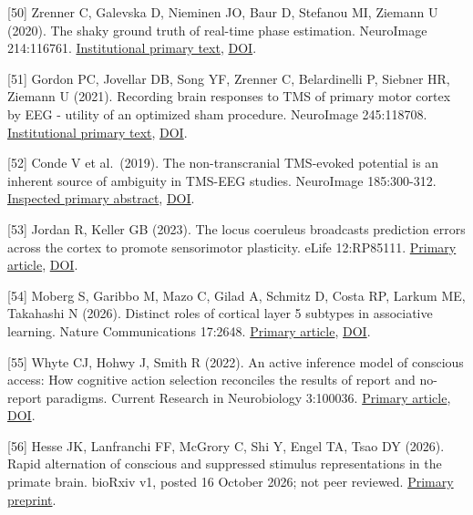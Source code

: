 \documentclass[
  american,
  11pt,
  letterpaper,
]{article}
\begin{document}
{[}50{]} Zrenner C, Galevska D, Nieminen JO, Baur D, Stefanou MI, Ziemann U (2020). The shaky ground truth of real-time phase estimation. NeuroImage 214:116761. \href{https://acris.aalto.fi/ws/portalfiles/portal/42216767/Zrenner_The_Shaky_Ground.1_s2.0_S1053811920302482_main.pdf}{Institutional primary text}, \href{https://doi.org/10.1016/j.neuroimage.2020.116761}{DOI}.

{[}51{]} Gordon PC, Jovellar DB, Song YF, Zrenner C, Belardinelli P, Siebner HR, Ziemann U (2021). Recording brain responses to TMS of primary motor cortex by EEG - utility of an optimized sham procedure. NeuroImage 245:118708. \href{https://iris.unitn.it/retrieve/handle/11572/325772/512900/Gordon_NI_2021.pdf}{Institutional primary text}, \href{https://doi.org/10.1016/j.neuroimage.2021.118708}{DOI}.

{[}52{]} Conde V et al.~(2019). The non-transcranial TMS-evoked potential is an inherent source of ambiguity in TMS-EEG studies. NeuroImage 185:300-312. \href{https://pubmed.ncbi.nlm.nih.gov/30347282/}{Inspected primary abstract}, \href{https://doi.org/10.1016/j.neuroimage.2018.10.052}{DOI}.

{[}53{]} Jordan R, Keller GB (2023). The locus coeruleus broadcasts prediction errors across the cortex to promote sensorimotor plasticity. eLife 12:RP85111. \href{https://pmc.ncbi.nlm.nih.gov/articles/PMC10328511/}{Primary article}, \href{https://doi.org/10.7554/eLife.85111}{DOI}.

{[}54{]} Moberg S, Garibbo M, Mazo C, Gilad A, Schmitz D, Costa RP, Larkum ME, Takahashi N (2026). Distinct roles of cortical layer 5 subtypes in associative learning. Nature Communications 17:2648. \href{https://pmc.ncbi.nlm.nih.gov/articles/PMC13004866/}{Primary article}, \href{https://doi.org/10.1038/s41467-026-68307-5}{DOI}.

{[}55{]} Whyte CJ, Hohwy J, Smith R (2022). An active inference model of conscious access: How cognitive action selection reconciles the results of report and no-report paradigms. Current Research in Neurobiology 3:100036. \href{https://pmc.ncbi.nlm.nih.gov/articles/PMC9593308/}{Primary article}, \href{https://doi.org/10.1016/j.crneur.2022.100036}{DOI}.

{[}56{]} Hesse JK, Lanfranchi FF, McGrory C, Shi Y, Engel TA, Tsao DY (2026). Rapid alternation of conscious and suppressed stimulus representations in the primate brain. bioRxiv v1, posted 16 October 2026; not peer reviewed. \href{https://doi.org/10.64898/2026.10.15.759299}{Primary preprint}.
\end{document}
